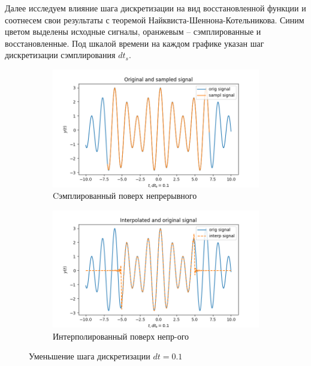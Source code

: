 \documentclass[a4paper, 12pt]{article}
\begin{document}
    Далее исследуем влияние шага дискретизации на вид восстановленной функции
    и соотнесем свои результаты с теоремой Найквиста-Шеннона-Котельникова. Синим цветом выделены исходные сигналы, оранжевым --
    сэмплированные и восстановленные. Под шкалой времени на каждом графике указан шаг дискретизации сэмплирования $dt_s$.
    \begin{figure}[H]
        \centering
        \begin{subfigure}{0.45\textwidth}
            \centering
            \includegraphics[width=\linewidth]{2_sine.png}
            \caption{Cэмплированный поверх непрерывного}
            \label{fig:2sine}
        \end{subfigure}
        \hspace{5mm}
        \begin{subfigure}{0.45\textwidth}
            \centering
            \includegraphics[width=\linewidth]{2_isine.png}
            \caption{Интерполированный поверх непр-ого}
            \label{fig:2isine}
        \end{subfigure}
        \caption{Уменьшение шага дискретизации $dt=0.1$}
        \label{fig:sines2}
    \end{figure}
\end{document}
